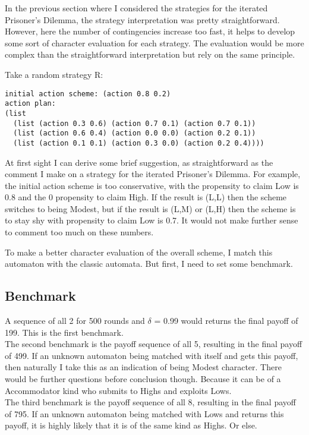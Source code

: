 \documentclass[12.5pt]{report}
\begin{document}
In the previous section where I considered the strategies for the iterated Prisoner's Dilemma, the strategy interpretation was pretty straightforward. However, here the number of contingencies increase too fast, it helps to develop some sort of character evaluation for each strategy. The evaluation would be more complex than the straightforward interpretation but rely on the same principle.

Take a random strategy R:

\begin{verbatim}
initial action scheme: (action 0.8 0.2)
action plan:
(list
  (list (action 0.3 0.6) (action 0.7 0.1) (action 0.7 0.1))
  (list (action 0.6 0.4) (action 0.0 0.0) (action 0.2 0.1))
  (list (action 0.1 0.1) (action 0.3 0.0) (action 0.2 0.4))))

\end{verbatim}

At first sight I can derive some brief suggestion, as straightforward as the comment I make on a strategy for the iterated Prisoner's Dilemma. For example, the initial action scheme is too conservative, with the propensity to claim Low is 0.8 and the 0 propensity to claim High. If the result is (L,L) then the scheme switches to being Modest, but if the result is (L,M) or (L,H) then the scheme is to stay shy with propensity to claim Low is 0.7. It would not make further sense to comment too much on these numbers.

To make a better character evaluation of the overall scheme, I match this automaton with the classic automata. But first, I need to set some benchmark.

\subsection{Benchmark}

A sequence of all 2 for 500 rounds and $\delta$ = 0.99 would returns the final payoff of 199. This is the first benchmark.\\

The second benchmark is the payoff sequence of all 5, resulting in the final payoff of 499. If an unknown automaton being matched with itself and gets this payoff, then naturally I take this as an indication of being Modest character. There would be further questions before conclusion though. Because it can be of a Accommodator kind who submits to Highs and exploits Lows.\\

The third benchmark is the payoff sequence of all 8, resulting in the final payoff of 795. If an unknown automaton being matched with Lows and returns this payoff, it is highly likely that it is of the same kind as Highs. Or else.\\
\end{document}
